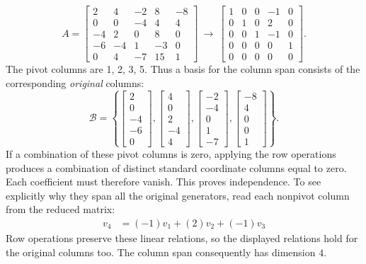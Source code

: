 \[A=\left[\begin{array}{rrrrr}2&4&-2&8&-8\\0&0&-4&4&4\\-4&2&0&8&0\\-6&-4&1&-3&0\\0&4&-7&15&1\end{array}\right]\ \longrightarrow\ \left[\begin{array}{rrrrr}1&0&0&-1&0\\0&1&0&2&0\\0&0&1&-1&0\\0&0&0&0&1\\0&0&0&0&0\end{array}\right].\]
The pivot columns are 1, 2, 3, 5. Thus a basis for the column span consists of the corresponding \emph{original} columns:
\[\mathcal B=\left\{\left[\begin{array}{r}2\\0\\-4\\-6\\0\end{array}\right],\left[\begin{array}{r}4\\0\\2\\-4\\4\end{array}\right],\left[\begin{array}{r}-2\\-4\\0\\1\\-7\end{array}\right],\left[\begin{array}{r}-8\\4\\0\\0\\1\end{array}\right]\right\}.\]
If a combination of these pivot columns is zero, applying the row operations produces a combination of distinct standard coordinate columns equal to zero. Each coefficient must therefore vanish. This proves independence. To see explicitly why they span all the original generators, read each nonpivot column from the reduced matrix:
\[\begin{aligned}v_{4}&=(-1)v_{1}+(2)v_{2}+(-1)v_{3}\end{aligned}\]
Row operations preserve these linear relations, so the displayed relations hold for the original columns too. The column span consequently has dimension $4$.


